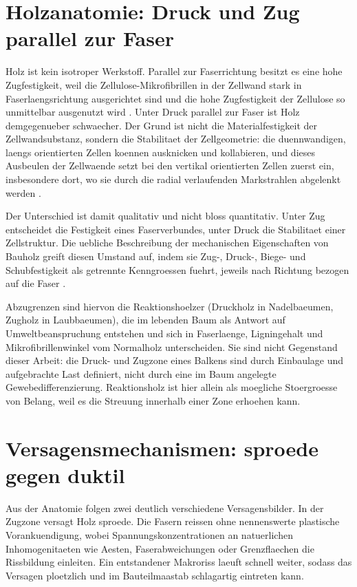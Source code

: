 \section{Holzanatomie: Druck und Zug parallel zur Faser}
\label{sec:anatomie}

Holz ist kein isotroper Werkstoff. Parallel zur Faserrichtung besitzt es eine
hohe Zugfestigkeit, weil die Zellulose-Mikrofibrillen in der Zellwand stark in
Faserlaengsrichtung ausgerichtet sind und die hohe Zugfestigkeit der Zellulose
so unmittelbar ausgenutzt wird \parencite{doitpoms}. Unter Druck parallel zur
Faser ist Holz demgegenueber schwaecher. Der Grund ist nicht die
Materialfestigkeit der Zellwandsubstanz, sondern die Stabilitaet der
Zellgeometrie: die duennwandigen, laengs orientierten Zellen koennen
ausknicken und kollabieren, und dieses Ausbeulen der Zellwaende setzt bei den
vertikal orientierten Zellen zuerst ein, insbesondere dort, wo sie durch die
radial verlaufenden Markstrahlen abgelenkt werden \parencite{doitpoms}.

Der Unterschied ist damit qualitativ und nicht bloss quantitativ. Unter Zug
entscheidet die Festigkeit eines Faserverbundes, unter Druck die Stabilitaet
einer Zellstruktur. Die uebliche Beschreibung der mechanischen Eigenschaften von
Bauholz greift diesen Umstand auf, indem sie Zug-, Druck-, Biege- und
Schubfestigkeit als getrennte Kenngroessen fuehrt, jeweils nach Richtung
bezogen auf die Faser \parencite{usdaTimberBridge}.

Abzugrenzen sind hiervon die Reaktionshoelzer (Druckholz in Nadelbaeumen,
Zugholz in Laubbaeumen), die im lebenden Baum als Antwort auf
Umweltbeanspruchung entstehen und sich in Faserlaenge, Ligningehalt und
Mikrofibrillenwinkel vom Normalholz unterscheiden. Sie sind nicht Gegenstand
dieser Arbeit: die Druck- und Zugzone eines Balkens sind durch Einbaulage und
aufgebrachte Last definiert, nicht durch eine im Baum angelegte
Gewebedifferenzierung. Reaktionsholz ist hier allein als moegliche Stoergroesse
von Belang, weil es die Streuung innerhalb einer Zone erhoehen kann.

\section{Versagensmechanismen: sproede gegen duktil}
\label{sec:versagen}

Aus der Anatomie folgen zwei deutlich verschiedene Versagensbilder. In der
Zugzone versagt Holz sproede. Die Fasern reissen ohne nennenswerte plastische
Vorankuendigung, wobei Spannungskonzentrationen an natuerlichen Inhomogenitaeten
wie Aesten, Faserabweichungen oder Grenzflaechen die Rissbildung einleiten. Ein
entstandener Makroriss laeuft schnell weiter, sodass das Versagen ploetzlich und
im Bauteilmaastab schlagartig eintreten kann.

